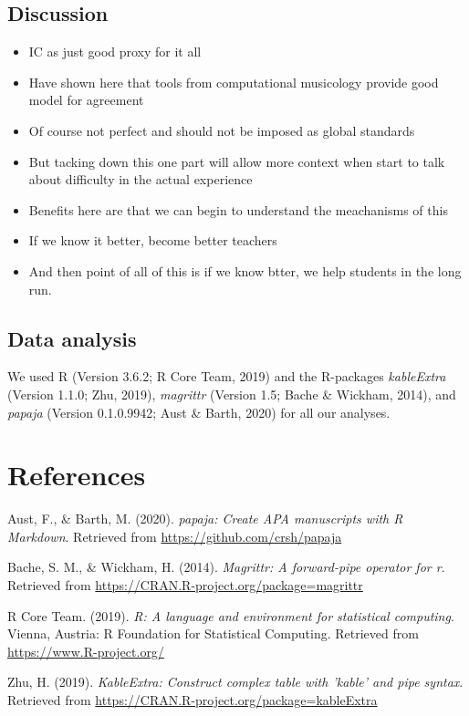 \documentclass[english,man,floatsintext]{apa6}
\providecommand{\tightlist}{%
  \setlength{\itemsep}{0pt}\setlength{\parskip}{0pt}}
\begin{document}
\hypertarget{discussion}{%
\subsection{Discussion}\label{discussion}}

\begin{itemize}
\tightlist
\item
  IC as just good proxy for it all
\item
  Have shown here that tools from computational musicology provide good model for agreement
\item
  Of course not perfect and should not be imposed as global standards
\item
  But tacking down this one part will allow more context when start to talk about difficulty in the actual experience
\item
  Benefits here are that we can begin to understand the meachanisms of this
\item
  If we know it better, become better teachers
\item
  And then point of all of this is if we know btter, we help students in the long run.
\end{itemize}

\hypertarget{data-analysis}{%
\subsection{Data analysis}\label{data-analysis}}

We used R (Version 3.6.2; R Core Team, 2019) and the R-packages \emph{kableExtra} (Version 1.1.0; Zhu, 2019), \emph{magrittr} (Version 1.5; Bache \& Wickham, 2014), and \emph{papaja} (Version 0.1.0.9942; Aust \& Barth, 2020) for all our analyses.

\newpage

\hypertarget{references}{%
\section{References}\label{references}}

\begingroup
\setlength{\parindent}{-0.5in}
\setlength{\leftskip}{0.5in}

\hypertarget{refs}{}
\leavevmode\hypertarget{ref-R-papaja}{}%
Aust, F., \& Barth, M. (2020). \emph{papaja: Create APA manuscripts with R Markdown}. Retrieved from \url{https://github.com/crsh/papaja}

\leavevmode\hypertarget{ref-R-magrittr}{}%
Bache, S. M., \& Wickham, H. (2014). \emph{Magrittr: A forward-pipe operator for r}. Retrieved from \url{https://CRAN.R-project.org/package=magrittr}

\leavevmode\hypertarget{ref-R-base}{}%
R Core Team. (2019). \emph{R: A language and environment for statistical computing}. Vienna, Austria: R Foundation for Statistical Computing. Retrieved from \url{https://www.R-project.org/}

\leavevmode\hypertarget{ref-R-kableExtra}{}%
Zhu, H. (2019). \emph{KableExtra: Construct complex table with 'kable' and pipe syntax}. Retrieved from \url{https://CRAN.R-project.org/package=kableExtra}

\endgroup
\end{document}
